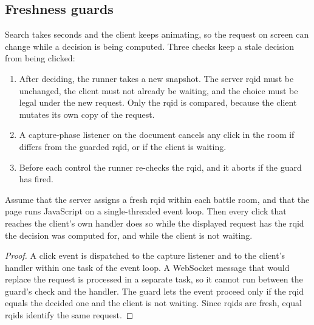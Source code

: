 \subsection{Freshness guards}
Search takes seconds and the client keeps animating, so the request on screen
can change while a decision is being computed. Three checks keep a stale
decision from being clicked:
\begin{enumerate}
  \item After deciding, the runner takes a new snapshot. The server rqid must
    be unchanged, the client must not already be waiting, and the choice must
    be legal under the new request. Only the rqid is compared, because the
    client mutates its own copy of the request.
  \item A capture-phase listener on the document cancels any click in the room
    if  differs from the guarded rqid, or if the client is
    waiting.
  \item Before each control the runner re-checks the rqid, and it aborts if
    the guard has fired.
\end{enumerate}

\begin{proposition}
\label{prop:fresh}
Assume that the server assigns a fresh rqid within each battle room, and that the page
runs JavaScript on a single-threaded event loop. Then every click that
reaches the client's own handler does so while the displayed request has the
rqid the decision was computed for, and while the client is not waiting.
\end{proposition}
\begin{proof}
A click event is dispatched to the capture listener and to the client's
handler within one task of the event loop. A WebSocket message that would
replace the request is processed in a separate task, so it cannot run between
the guard's check and the handler. The guard lets the event proceed only if
the rqid equals the decided one and the client is not waiting. Since rqids are
fresh, equal rqids identify the same request.
\end{proof}


